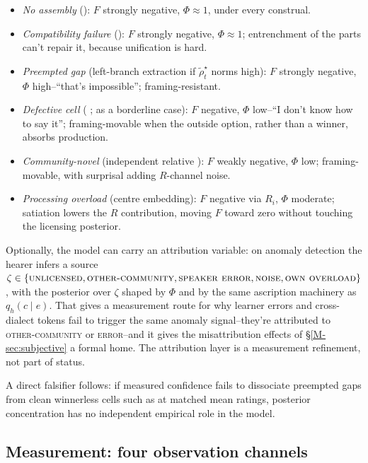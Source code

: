 \begin{itemize}
\item \emph{No assembly} (): $F$ strongly negative, $\Phi\approx1$, under every construal.
\item \emph{Compatibility failure} (): $F$ strongly negative, $\Phi\approx1$; entrenchment of the parts can't repair it, because unification is hard.
\item \emph{Preempted gap} (left-branch extraction if
  $\widetilde{\rho}_t^\star$ norms high): $F$ strongly negative, $\Phi$
  high--\enquote{that's impossible}; framing-resistant.
\item \emph{Defective cell} ( ;  as a borderline case): $F$ negative, $\Phi$ low--\enquote{I don't know how to say it}; framing-movable when the outside option, rather than a winner, absorbs production.
\item \emph{Community-novel} (independent relative ): $F$ weakly negative, $\Phi$ low; framing-movable, with surprisal adding $R$-channel noise.
\item \emph{Processing overload} (centre embedding): $F$ negative via $R_i$, $\Phi$ moderate; satiation lowers the $R$ contribution, moving $F$ toward zero without touching the licensing posterior.
\end{itemize}

Optionally, the model can carry an attribution variable: on anomaly detection
the hearer infers a source
$\zeta\in\{\textsc{unlicensed},\textsc{other-community},\textsc{speaker error},
\textsc{noise},\textsc{own overload}\}$, with the posterior over $\zeta$ shaped
by $\Phi$ and by the same ascription machinery as $q_h(c\mid e)$. That gives a
measurement route for why learner errors and cross-dialect tokens fail to
trigger the same anomaly signal--they're attributed to \textsc{other-community}
or \textsc{error}--and it gives the misattribution effects of
\S\ref{M-sec:subjective} a formal home. The attribution layer is a measurement
refinement, not part of status.

A direct falsifier follows: if measured confidence fails to dissociate preempted
gaps from clean winnerless cells such as   at
matched mean ratings, posterior concentration has no independent empirical role
in the model.

\subsection{Measurement: four observation channels}
\label{sec:measurement-C}

